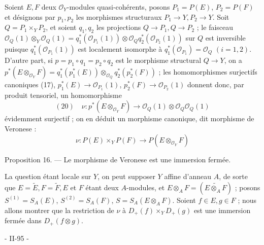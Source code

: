 Soient $E, F$ deux $\mathcal{O}_Y$-modules quasi-cohérents, posons $P_1 = P(E)$, $P_2 = P(F)$ et désignons par $p_1, p_2$ les morphismes structuraux $P_1 \to Y, P_2 \to Y$. Soit $Q = P_1 \times_Y P_2$, et soient $q_1, q_2$ les projections $Q \to P_1, Q \to P_2$ ; le faisceau $\mathcal{O}_Q(1) \otimes_Y \mathcal{O}_Q(1) = q_1^*(\mathcal{O}_{P_1}(1)) \otimes \mathcal{O}_Q q_2^*(\mathcal{O}_{P_2}(1))$ sur $Q$ est inversible puisque $q_1^*(\mathcal{O}_{P_1}(1))$ est localement isomorphe à $q_1^*(\mathcal{O}_{P_1}) = \mathcal{O}_Q$ $(i=1,2)$. D'autre part, si $p = p_1 \circ q_1 = p_2 \circ q_2$ est le morphisme structural $Q \to Y$, on a $p^*(E \otimes_{\mathcal{O}_Y} F) = q_1^*(p_1^*(E)) \otimes_{\mathcal{O}_Q} q_2^*(p_2^*(F))$ ; les homomorphismes surjectifs canoniques (17), $p_1^*(E) \to \mathcal{O}_{P_1}(1)$, $p_2^*(F) \to \mathcal{O}_{P_2}(1)$ donnent donc, par produit tensoriel, un homomorphisme
$$(20) \quad \nu : p^*(E \otimes_{\mathcal{O}_Y} F) \to \mathcal{O}_Q(1) \otimes \mathcal{O}_Q \mathcal{O}_Q(1)$$
évidemment surjectif ; on en déduit un morphisme canonique, dit morphisme de Veronese :
$$\nu : P(E) \times_Y P(F) \to P(E \otimes_{\mathcal{O}_Y} F)$$

Proposition 16. — Le morphisme de Veronese est une immersion fermée.

La question étant locale sur $Y$, on peut supposer $Y$ affine d'anneau $A$, de sorte que $E = \tilde{E}, F = \tilde{F}, E$ et $F$ étant deux $A$-modules, et $E \otimes_A F = (\widetilde{E \otimes_A F})$ ; posons $S^{(1)} = S_A(E)$, $S^{(2)} = S_A(F)$, $S = S_A(E \otimes_A F)$. Soient $f \in E, g \in F$ ; nous allons montrer que la restriction de $\nu$ à $D_+(f) \times_Y D_+(g)$ est une immersion fermée dans $D_+(f \otimes g)$.

\newpage


- II-95 -

